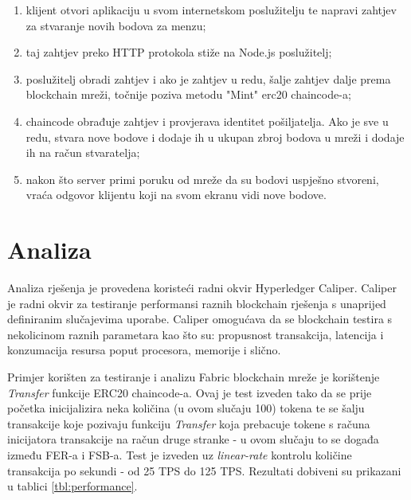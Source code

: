 \documentclass[times, utf8, diplomski]{fer}
\begin{document}
\begin{enumerate}
\item klijent otvori aplikaciju u svom internetskom poslužitelju te napravi zahtjev za stvaranje novih bodova za menzu;
\item taj zahtjev preko HTTP protokola stiže na Node.js poslužitelj;
\item poslužitelj obradi zahtjev i ako je zahtjev u redu, šalje zahtjev dalje prema blockchain mreži, točnije poziva metodu "Mint" erc20 chaincode-a;
\item chaincode obrađuje zahtjev i provjerava identitet pošiljatelja. Ako je sve u redu, stvara nove bodove i dodaje ih u ukupan zbroj bodova u mreži i dodaje ih na račun stvaratelja;
\item nakon što server primi poruku od mreže da su bodovi uspješno stvoreni, vraća odgovor klijentu koji na svom ekranu vidi nove bodove.
\end{enumerate}

\section{Analiza}

Analiza rješenja je provedena koristeći radni okvir Hyperledger Caliper.  Caliper je radni okvir za testiranje performansi raznih blockchain rješenja s unaprijed definiranim slučajevima uporabe.  Caliper omogućava da se blockchain testira s nekolicinom raznih parametara kao što su: propusnost transakcija,  latencija i konzumacija resursa poput procesora, memorije i slično.

Primjer korišten za testiranje i analizu Fabric blockchain mreže je korištenje \textit{Transfer} funkcije ERC20 chaincode-a. Ovaj je test izveden tako da se prije početka inicijalizira neka količina (u ovom slučaju 100) tokena te se šalju transakcije koje pozivaju funkciju \textit{Transfer} koja prebacuje tokene s računa inicijatora transakcije na račun druge stranke - u ovom slučaju to se događa između FER-a i FSB-a.  Test je izveden uz \textit{linear-rate} kontrolu količine transakcija po sekundi - od 25 TPS do 125 TPS. Rezultati dobiveni su prikazani u tablici \ref{tbl:performance}.


\begin{table}[htb]
\centering
\caption{Performanse}
\label{tbl:performance}
\end{table}
\end{document}
